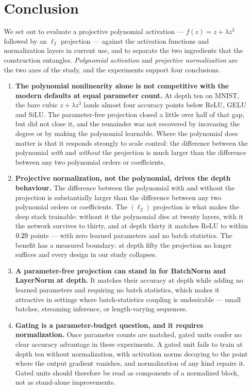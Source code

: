 \section{Conclusion}
\label{sec:conclusion}

We set out to evaluate a projective polynomial activation --- $f(z) = z +
\lambda z^{3}$ followed by an $\ell_2$ projection --- against the activation
functions and normalization layers in current use, and to separate the two
ingredients that the construction entangles. \emph{Polynomial activation} and
\emph{projective normalization} are the two axes of the study, and the
experiments support four conclusions.

\begin{enumerate}
\item \textbf{The polynomial nonlinearity alone is not competitive with the
modern defaults at equal parameter count.} At depth ten on MNIST, the bare
cubic $z + \lambda z^{3}$ lands almost four accuracy points below ReLU, GELU and
SiLU. The parameter-free projection closed a little over half of that gap, but
did not close it, and the remainder was not recovered by increasing the degree
or by making the polynomial learnable. Where the polynomial does matter is that
it responds strongly to scale control: the difference between the polynomial
\emph{with} and \emph{without} the projection is much larger than the difference
between any two polynomial orders or coefficients.

\item \textbf{Projective normalization, not the polynomial, drives the depth
behaviour.} The difference between the polynomial with and without the
projection is substantially larger than the difference between any two
polynomial orders or coefficients. The $(\ell_2)$ projection is what makes the
deep stack trainable: without it the polynomial dies at twenty layers, with it
the network survives to thirty, and at depth thirty it matches ReLU to within
$0.29$ points --- with zero learned parameters and no batch
statistics. The benefit has a measured boundary: at depth fifty the projection
no longer suffices and every design in our study collapses.

\item \textbf{A parameter-free projection can stand in for BatchNorm and
LayerNorm at depth.} It matches their accuracy at depth while adding no
learned parameters and requiring no batch statistics, which makes it
attractive in settings where batch-statistics coupling is undesirable ---
small batches, streaming inference, or length-varying sequences.

\item \textbf{Gating is a parameter-budget question, and it requires
normalization.} Once parameter counts are matched, gated units confer no clear
accuracy advantage in these experiments. A gated unit fails
to train at depth ten without normalization, with activation norms decaying to
the point where the
output gradient vanishes, and normalization of any kind repairs it. Gated
units should therefore be read as components of a normalized block, not as
stand-alone improvements.

\end{enumerate}


